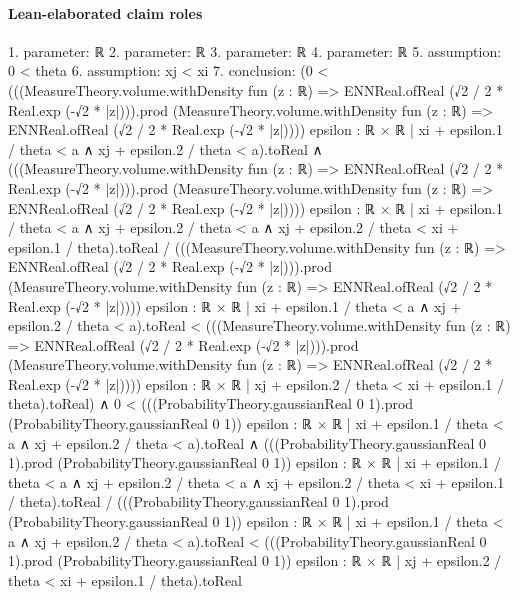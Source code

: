 \documentclass[10pt]{article}
\begin{document}
\paragraph{Lean-elaborated claim roles}\begin{ReviewVerbatim}
1. parameter: ℝ
2. parameter: ℝ
3. parameter: ℝ
4. parameter: ℝ
5. assumption: 0 < theta
6. assumption: xj < xi
7. conclusion: (0 <
      (((MeasureTheory.volume.withDensity fun (z : ℝ) => ENNReal.ofReal (√2 / 2 * Real.exp (-√2 * |z|))).prod
            (MeasureTheory.volume.withDensity fun (z : ℝ) => ENNReal.ofReal (√2 / 2 * Real.exp (-√2 * |z|))))
          {epsilon : ℝ × ℝ | xi + epsilon.1 / theta < a ∧ xj + epsilon.2 / theta < a}).toReal ∧
    (((MeasureTheory.volume.withDensity fun (z : ℝ) => ENNReal.ofReal (√2 / 2 * Real.exp (-√2 * |z|))).prod
              (MeasureTheory.volume.withDensity fun (z : ℝ) => ENNReal.ofReal (√2 / 2 * Real.exp (-√2 * |z|))))
            {epsilon : ℝ × ℝ |
              xi + epsilon.1 / theta < a ∧
                xj + epsilon.2 / theta < a ∧ xj + epsilon.2 / theta < xi + epsilon.1 / theta}).toReal /
        (((MeasureTheory.volume.withDensity fun (z : ℝ) => ENNReal.ofReal (√2 / 2 * Real.exp (-√2 * |z|))).prod
              (MeasureTheory.volume.withDensity fun (z : ℝ) => ENNReal.ofReal (√2 / 2 * Real.exp (-√2 * |z|))))
            {epsilon : ℝ × ℝ | xi + epsilon.1 / theta < a ∧ xj + epsilon.2 / theta < a}).toReal <
      (((MeasureTheory.volume.withDensity fun (z : ℝ) => ENNReal.ofReal (√2 / 2 * Real.exp (-√2 * |z|))).prod
            (MeasureTheory.volume.withDensity fun (z : ℝ) => ENNReal.ofReal (√2 / 2 * Real.exp (-√2 * |z|))))
          {epsilon : ℝ × ℝ | xj + epsilon.2 / theta < xi + epsilon.1 / theta}).toReal) ∧
  0 <
      (((ProbabilityTheory.gaussianReal 0 1).prod (ProbabilityTheory.gaussianReal 0 1))
          {epsilon : ℝ × ℝ | xi + epsilon.1 / theta < a ∧ xj + epsilon.2 / theta < a}).toReal ∧
    (((ProbabilityTheory.gaussianReal 0 1).prod (ProbabilityTheory.gaussianReal 0 1))
            {epsilon : ℝ × ℝ |
              xi + epsilon.1 / theta < a ∧
                xj + epsilon.2 / theta < a ∧ xj + epsilon.2 / theta < xi + epsilon.1 / theta}).toReal /
        (((ProbabilityTheory.gaussianReal 0 1).prod (ProbabilityTheory.gaussianReal 0 1))
            {epsilon : ℝ × ℝ | xi + epsilon.1 / theta < a ∧ xj + epsilon.2 / theta < a}).toReal <
      (((ProbabilityTheory.gaussianReal 0 1).prod (ProbabilityTheory.gaussianReal 0 1))
          {epsilon : ℝ × ℝ | xj + epsilon.2 / theta < xi + epsilon.1 / theta}).toReal
\end{ReviewVerbatim}
\end{document}
